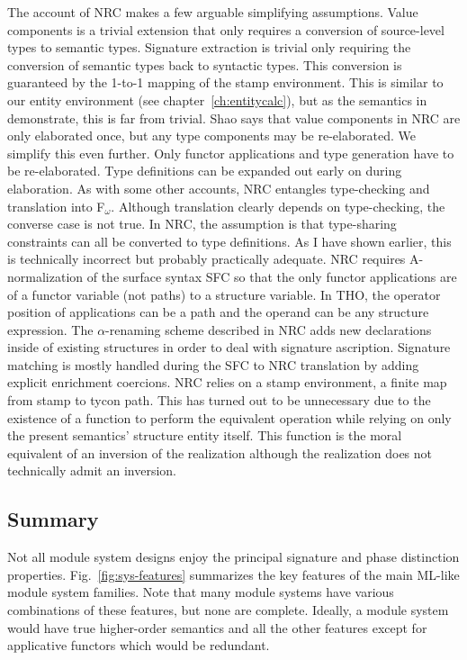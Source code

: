The account of NRC makes a few arguable
simplifying assumptions. Value components is a trivial extension that only requires a
  conversion of source-level types to semantic types. 
 Signature extraction is trivial only requiring the conversion of
  semantic types back to syntactic types. This conversion is
  guaranteed by the 1-to-1 mapping of the stamp environment. This is
  similar to our entity environment (see chapter~\ref{ch:entitycalc}), but as the semantics in 
  demonstrate, this is far from trivial.
 Shao says that value components in NRC are only elaborated once,
  but any type components may be re-elaborated. We simplify this even
  further. Only functor applications and type generation have to be
  re-elaborated. Type definitions can be expanded out early on during
  elaboration.
 As with some other accounts, NRC entangles type-checking and
  translation into F$_\omega$. Although translation clearly depends on
  type-checking, the converse case is not true. 
 In NRC, the assumption is that type-sharing constraints can all
  be converted to type definitions. As I have shown earlier, this is
  technically incorrect but probably practically adequate. 
 NRC requires A-normalization of the surface syntax SFC so that
  the only functor applications are of a functor variable (not
  paths) to a structure variable. In THO, the operator position of
  applications can be a path and the operand can be any structure
  expression. 
 The $\alpha$-renaming scheme described in NRC adds new
  declarations inside of existing structures in order to deal with
  signature ascription. 
 Signature matching is mostly handled during the SFC to NRC
  translation by adding explicit enrichment coercions. 
 NRC relies on a stamp environment, a finite map from stamp to
  tycon path. This has turned out to be unnecessary due to the
  existence of a function to perform the equivalent operation while
  relying on only the present semantics' structure entity itself. This function is the moral
  equivalent of an inversion of the realization although the
  realization does not technically admit an inversion. 


\subsection{Summary}
Not all module system designs enjoy the principal signature and phase distinction properties.  Fig.~\ref{fig:sys-features} summarizes the key features of the main ML-like module system families. Note that many module systems have various combinations of these features, but none are complete. Ideally, a module system would have true higher-order semantics and all the other features except for applicative functors which would be redundant. 

